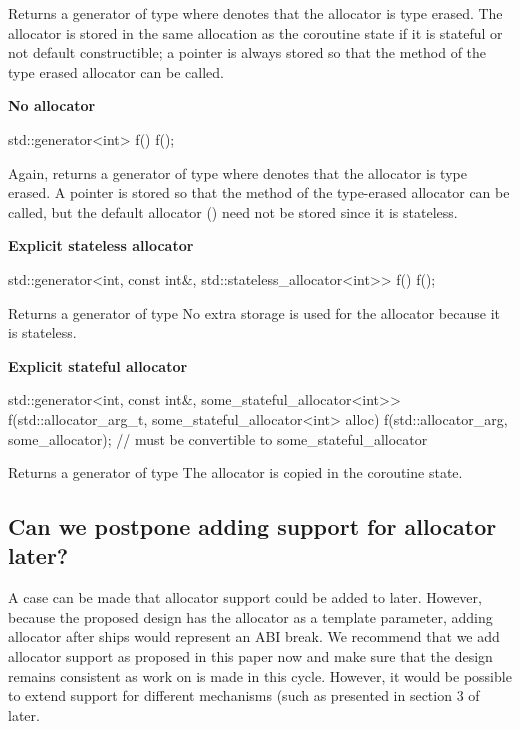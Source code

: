 \documentclass{wg21}
\begin{document}
Returns a generator of type 
where  denotes that the allocator is type erased.
The allocator is stored in the same allocation as the coroutine state
if it is stateful or not default constructible; a pointer is always stored so that
the  method of the type erased allocator can be called.

\textbf{No allocator}

\begin{colorblock}
std::generator<int> f() {}
f();
\end{colorblock}

Again, returns a generator of type 
where  denotes that the allocator is type erased.
A pointer is stored so that
the  method
of the type-erased allocator can be called,
but the default allocator ()
need not be stored since it is stateless.

\textbf{Explicit stateless allocator}

\begin{colorblock}
std::generator<int, const int&, std::stateless_allocator<int>> f() {}
f();
\end{colorblock}

Returns a generator of type
No extra storage is used for the allocator because it is stateless.

\textbf{Explicit stateful allocator}

\begin{colorblock}
std::generator<int, const int\&, some_stateful_allocator<int>>
    f(std::allocator_arg_t, some_stateful_allocator<int> alloc) {}
f(std::allocator_arg, some_allocator); // must be convertible to some_stateful_allocator
\end{colorblock}

Returns a generator of type 
The allocator is copied in the coroutine state.

\subsection{Can we postpone adding support for allocator later?}

A case can be made that allocator support could be added to  later.
However, because the proposed design has the allocator as a template parameter,
adding allocator after  ships would represent an ABI break.
We recommend that we add allocator support as proposed in this paper now and make sure that the design remains consistent as work on 
is made in this cycle.
However, it would be possible to extend support for different mechanisms (such as presented in section 3 of  later.
\end{document}
